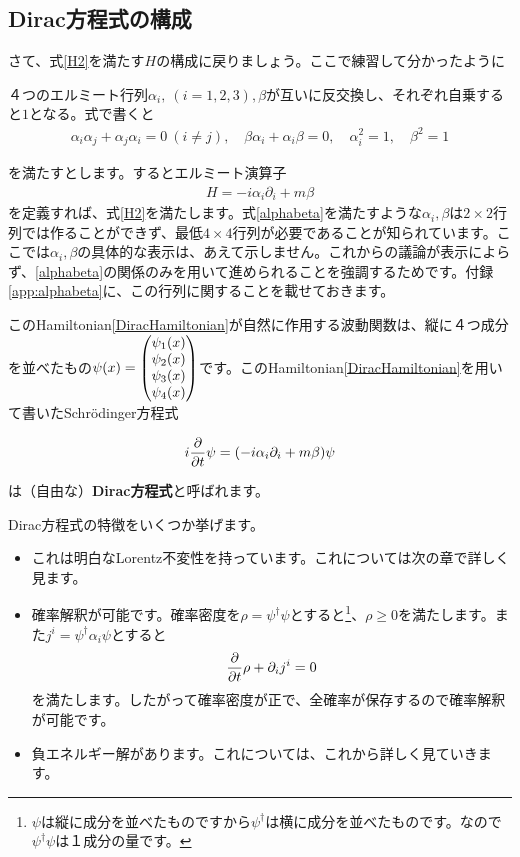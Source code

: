 \documentclass[report,paper=a4, fontsize=12pt, line_length=16cm, number_of_lines=33,dvipdfmx]{jlreq}
\newenvironment{important}{\begin{tcolorbox}[
  colback = white,
  colframe = red!35,
  boxrule = 2mm,
  fonttitle = \bfseries,
  after = \noindent] }{\end{tcolorbox}}
\numberwithin{equation}{chapter}
\newcommand{\del}{\partial}
\newcommand{\strong}[1]{{\sffamily \bfseries #1}}
\begin{document}
\subsection{Dirac方程式の構成}
さて、式\eqref{H2}を満たす$H$の構成に戻りましょう。ここで練習して分かったように
\begin{important}
  ４つのエルミート行列$\alpha_i,\ (i=1,2,3),\beta$が互いに反交換し、それぞれ自乗すると$1$となる。式で書くと
  \begin{align}
    \alpha_{i}\alpha_{j}+\alpha_{j}\alpha_{i}=0\ (i\ne j),\quad \beta \alpha_{i}+\alpha_{i}\beta=0,\quad
    \alpha_i^2=1,\quad \beta^2=1\label{alphabeta}
  \end{align}
\end{important}
を満たすとします。するとエルミート演算子
\begin{align}
  H=-i\alpha_i\del_i+m\beta \label{DiracHamiltonian}
\end{align}
を定義すれば、式\eqref{H2}を満たします。式\eqref{alphabeta}を満たすような$\alpha_i,\beta$は$2\times 2$行列では作ることができず、最低$4\times 4$行列が必要であることが知られています。ここでは$\alpha_i,\beta$の具体的な表示は、あえて示しません。これからの議論が表示によらず、\eqref{alphabeta}の関係のみを用いて進められることを強調するためです。付録\ref{app:alphabeta}に、この行列に関することを載せておきます。

このHamiltonian\eqref{DiracHamiltonian}が自然に作用する波動関数は、縦に４つ成分を並べたもの$\psi(x)=\mqty(\psi_1(x)\\\psi_2(x)\\\psi_3(x)\\\psi_4(x))$です。このHamiltonian\eqref{DiracHamiltonian}を用いて書いたSchrödinger方程式
\begin{important}
  \begin{align}
    i\pdv{t} \psi=(-i\alpha_i\del_i+m\beta)\psi
    \label{freeDiracequation}
  \end{align}
\end{important}
は（自由な）\strong{Dirac方程式}と呼ばれます。

Dirac方程式の特徴をいくつか挙げます。
\begin{itemize}
  \item これは明白なLorentz不変性を持っています。これについては次の章で詳しく見ます。
  \item 確率解釈が可能です。確率密度を$\rho=\psi^{\dag}\psi$とすると\footnote{$\psi$は縦に成分を並べたものですから$\psi^{\dag}$は横に成分を並べたものです。なので$\psi^{\dag}\psi$は１成分の量です。}、$\rho\ge 0$を満たします。また$j^i=\psi^{\dag}\alpha_i\psi$とすると
  \begin{align}
    \pdv{t} \rho+\del_{i}j^{i}=0
  \end{align}
  を満たします。したがって確率密度が正で、全確率が保存するので確率解釈が可能です。
  \item 負エネルギー解があります。これについては、これから詳しく見ていきます。
\end{itemize}
\end{document}
